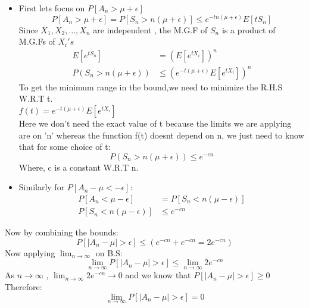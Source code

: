 \documentclass[12pt]{article}
\begin{document}
\begin{itemize}
    \item First lets focus on $P[A_n > \mu + \epsilon]$
\begin{equation}
    P[A_n > \mu+\epsilon]=P[S_n > n(\mu+\epsilon)] \leq e^{-tn(\mu+\epsilon)}E[tS_n]
\end{equation}
Since $X_1,X_2,\dots,X_n$ are independent , the M.G.F of $S_n$ is a product of M.G.Fs of $X_i's$
\begin{equation}
\begin{split}
    E[e^{tS_n}] &= (E[e^{tX_i}])^n\\
    P(S_n > n(\mu+\epsilon)) &\leq ( e^{-t(\mu+\epsilon)}E[e^{tX_i}])^n
\end{split}
\end{equation}
To get the minimum range in the bound,we need to minimize the R.H.S W.R.T t.\\

$f(t) = e^{-t(\mu+\epsilon)}E[e^{tX_i}]$\\

Here we don't need the exact value of t because the limits we are applying are on 'n' whereas the function f(t) doesnt depend on n, we just need to know that for some choice of t:
\begin{equation}
     P(S_n > n(\mu+\epsilon)) \leq e^{-cn}
\end{equation}
Where, c is a constant W.R.T n.\\
\item Similarly for $P[A_n - \mu < -\epsilon]$:
\begin{equation}
\begin{split}
     P[A_n  < \mu -\epsilon] &= P[S_n < n( \mu -\epsilon)]\\
     P[S_n < n( \mu -\epsilon)] &\leq e^{-cn} 
\end{split}
\end{equation}
\end{itemize}
Now by combining the bounds:
\begin{equation}
    P[|A_n - \mu| > \epsilon] \leq (e^{-cn} + e^{-cn} = 2e^{-cn}) 
\end{equation}
Now applying $\lim_{n\to\infty}$ on B.S:
\begin{equation}
    \lim_{n\to\infty}P[|A_n - \mu| > \epsilon] \leq \lim_{n\to\infty}2e^{-cn}
\end{equation}
As $n \to \infty$ , $\lim_{n\to\infty}2e^{-cn} \to 0$ and we know that
$P[|A_n - \mu| > \epsilon] \geq 0$\\
Therefore:
\begin{equation}
     \lim_{n\to\infty}P[|A_n - \mu| > \epsilon] = 0
\end{equation}
\end{document}
